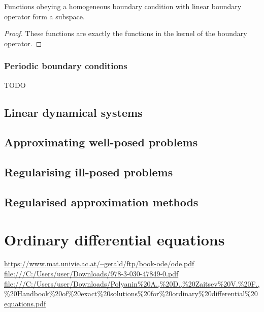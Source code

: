 \begin{lemma}
Functions obeying a homogeneous boundary condition with linear boundary operator form a subspace.
\end{lemma}
\begin{proof}
These functions are exactly the functions in the kernel of the boundary operator.
\end{proof}

\subsection{Periodic boundary conditions}
TODO

\section{Linear dynamical systems}



\section{Approximating well-posed problems}
\section{Regularising ill-posed problems}
\section{Regularised approximation methods}


\chapter{Ordinary differential equations}
\url{https://www.mat.univie.ac.at/~gerald/ftp/book-ode/ode.pdf}
\url{file:///C:/Users/user/Downloads/978-3-030-47849-0.pdf}
\url{file:///C:/Users/user/Downloads/Polyanin%20A.,%20D.,%20Zaitsev%20V.%20F.,%20Handbook%20of%20exact%20solutions%20for%20ordinary%20differential%20equations.pdf}

